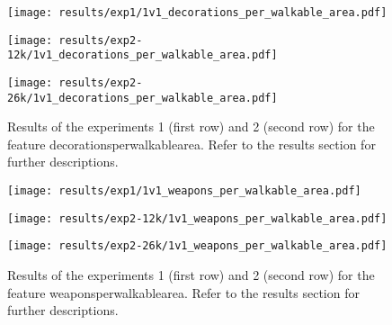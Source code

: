 
\begin{figure}[h!]
    \centering
	\begin{minipage}{0.3\linewidth}
		\texttt{[image: results/exp1/1v1\_decorations\_per\_walkable\_area.pdf]}
	\end{minipage}

	\begin{minipage}{0.3\linewidth}
		\texttt{[image: results/exp2-12k/1v1\_decorations\_per\_walkable\_area.pdf]}
	\end{minipage}
	\begin{minipage}{0.3\linewidth}
		\texttt{[image: results/exp2-26k/1v1\_decorations\_per\_walkable\_area.pdf]}
	\end{minipage}

	\caption[ Results: Feature decorations\textunderscore per\textunderscore walkable\textunderscore area]{ Results of the experiments 1 (first row) and 2 (second row) for the feature decorations\textunderscore per\textunderscore walkable\textunderscore area. Refer to the results section for further descriptions. }
	\label{fig:appendix_decorations_per_walkable_area}
\end{figure}
 
\begin{figure}[h!]
    \centering
	\begin{minipage}{0.3\linewidth}
		\texttt{[image: results/exp1/1v1\_weapons\_per\_walkable\_area.pdf]}
	\end{minipage}

	\begin{minipage}{0.3\linewidth}
		\texttt{[image: results/exp2-12k/1v1\_weapons\_per\_walkable\_area.pdf]}
	\end{minipage}
	\begin{minipage}{0.3\linewidth}
		\texttt{[image: results/exp2-26k/1v1\_weapons\_per\_walkable\_area.pdf]}
	\end{minipage}

	\caption[ Results: Feature weapons\textunderscore per\textunderscore walkable\textunderscore area]{ Results of the experiments 1 (first row) and 2 (second row) for the feature weapons\textunderscore per\textunderscore walkable\textunderscore area. Refer to the results section for further descriptions. }
	\label{fig:appendix_weapons_per_walkable_area}
\end{figure}
 \newpage 

